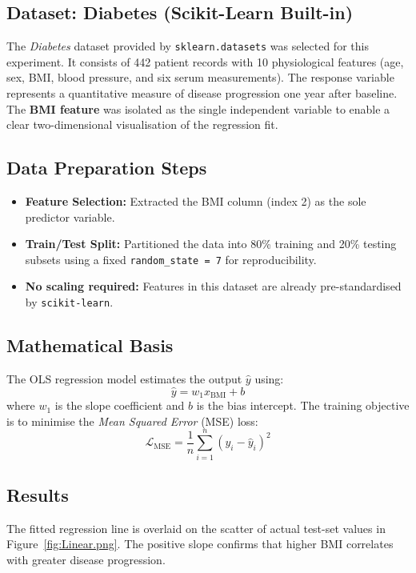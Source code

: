 \documentclass[12pt]{article}
\begin{document}
\subsection{Dataset: Diabetes (Scikit-Learn Built-in)}
The \textit{Diabetes} dataset provided by \texttt{sklearn.datasets} was selected for this experiment. It consists of 442 patient records with 10 physiological features (age, sex, BMI, blood pressure, and six serum measurements). The response variable represents a quantitative measure of disease progression one year after baseline. The \textbf{BMI feature} was isolated as the single independent variable to enable a clear two-dimensional visualisation of the regression fit.

\subsection{Data Preparation Steps}
\begin{itemize}[leftmargin=2em, itemsep=3pt]
    \item \textbf{Feature Selection:} Extracted the BMI column (index 2) as the sole predictor variable.
    \item \textbf{Train/Test Split:} Partitioned the data into 80\% training and 20\% testing subsets using a fixed \texttt{random\_state = 7} for reproducibility.
    \item \textbf{No scaling required:} Features in this dataset are already pre-standardised by \texttt{scikit-learn}.
\end{itemize}

\subsection{Mathematical Basis}
The OLS regression model estimates the output $\hat{y}$ using:
\[
\hat{y} = w_1 x_{\text{BMI}} + b
\]
where $w_1$ is the slope coefficient and $b$ is the bias intercept. The training objective is to minimise the \emph{Mean Squared Error} (MSE) loss:
\[
\mathcal{L}_{\text{MSE}} = \frac{1}{n}\sum_{i=1}^{n}(y_i - \hat{y}_i)^2
\]

\subsection{Results}
The fitted regression line is overlaid on the scatter of actual test-set values in Figure~\ref{fig:Linear.png}. The positive slope confirms that higher BMI correlates with greater disease progression.
\end{document}
